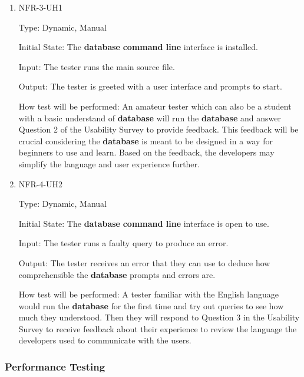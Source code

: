 \documentclass[12pt, titlepage]{article}
\begin{document}
\begin{enumerate}
    \item{NFR-3-UH1\\}
    
    Type: Dynamic, Manual
    
    Initial State: The \textbf{database} \textbf{command line} interface is installed. 
    
    Input: The tester runs the main source file. 
    
    Output: The tester is greeted with a user interface and prompts to start.
    
    How test will be performed: An amateur tester which can also be a student with a basic understand of \textbf{database} will run the \textbf{database} and answer Question 2 of the Usability Survey to provide feedback. This feedback will be crucial considering the \textbf{database} is meant to be designed in a way for beginners to use and learn. Based on the feedback, the developers may simplify the language and user experience further. 
    
    \item{NFR-4-UH2\\}
    
    Type: Dynamic, Manual
    
    Initial State: The \textbf{database} \textbf{command line} interface is open to use. 
    
    Input: The tester runs a faulty query to produce an error. 
    
    Output: The tester receives an error that they can use to deduce how comprehensible the \textbf{database} prompts and errors are. 
    
    How test will be performed: A tester familiar with the English language would run the \textbf{database} for the first time and try out queries to see how much they understood. Then they will respond to Question 3 in the Usability Survey to receive feedback about their experience to review the language the developers used to communicate with the users. 
\end{enumerate}

\subsubsection{Performance Testing}
\end{document}
